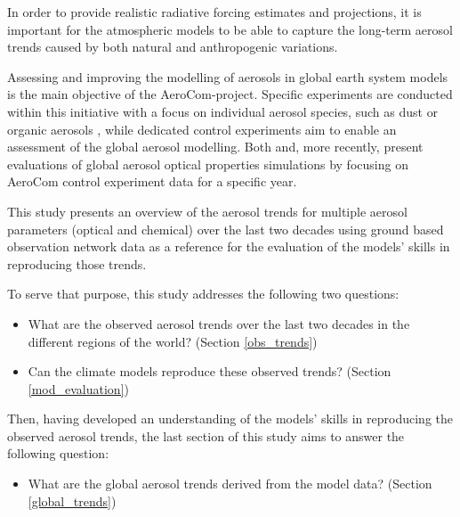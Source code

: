 \documentclass[acp, manuscript]{copernicus}
\begin{document}
In order to provide realistic radiative forcing estimates and projections, it is important for the atmospheric models to be able to capture the long-term aerosol trends caused by both natural and anthropogenic variations. 


Assessing and improving the modelling of aerosols in global earth system models is the main objective of the AeroCom-project. Specific experiments are conducted within this initiative with a focus on individual aerosol species, such as dust \citep{Huneeus-acp-2011} or organic aerosols \citep{Tsigaridis-acp-2014}, while dedicated control experiments aim to enable an assessment of the global aerosol modelling. Both \cite{kinne-acp-2006} and, more recently, \cite{jonaseval} present evaluations of global aerosol optical properties simulations by focusing on AeroCom control experiment data for a specific year. 

This study presents an overview of the aerosol trends for multiple aerosol parameters (optical and chemical) over the last two decades using ground based observation network data as a reference for the evaluation of the models' skills in reproducing those trends.

To serve that purpose, this study addresses the following two questions:
\begin{itemize}
    \item What are the observed aerosol trends over the last two decades in the different regions of the world? (Section \ref{obs_trends})
    \item Can the climate models reproduce these observed trends? (Section \ref{mod_evaluation})
\end{itemize}

Then, having developed an understanding of the models' skills in reproducing the observed aerosol trends, the last section of this study aims to answer the following question:
\begin{itemize}
    \item What are the global aerosol trends derived from the model data? (Section \ref{global_trends}) 
\end{itemize}
\end{document}
